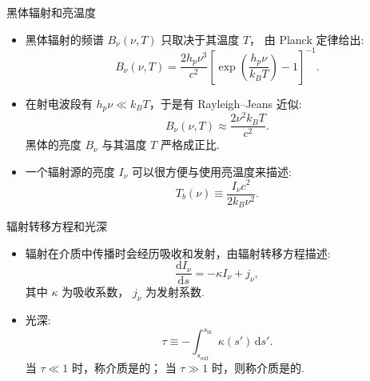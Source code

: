 \documentclass{beamer}
\newcommand{\R}[1]{\text{#1}}  %
\newcommand{\D}[1]{\R{d}#1}
\newcommand{\diff}[2]{\frac{\D{#1}}{\D{#2}}}
\let\emph\relax  %
\begin{document}
\begin{frame}{黑体辐射和亮温度}
  \begin{itemize}
    \item \alert{黑体辐射}的频谱 $B_{\nu}(\nu, T)$ 只取决于其温度 $T$，
      由 \alert{Planck 定律}给出:
      \begin{equation}
        B_{\nu}(\nu, T) =
          \frac{2 h_p \nu^3}{c^2} \left[ \exp\left(
            \frac{h_p \nu}{k_B T} \right) - 1 \right]^{-1} .
      \end{equation}
    \item 在射电波段有 $h_p \nu \ll k_B T$，于是有 \alert{Rayleigh--Jeans 近似}:
      \begin{equation}
        B_{\nu}(\nu, T) \approx \frac{2 \nu^2 k_B T}{c^2} .
      \end{equation}
      黑体的亮度 $B_{\nu}$ 与其温度 $T$ 严格成正比.
    \item 一个辐射源的亮度 $I_{\nu}$ 可以很方便与使用\alert{亮温度}来描述:
      \begin{equation}
        T_b(\nu) \equiv \frac{I_{\nu} c^2}{2 k_B \nu^2} .
      \end{equation}
  \end{itemize}
\end{frame}

\begin{frame}{辐射转移方程和光深}
  \begin{itemize}
    \item 辐射在介质中传播时会经历吸收和发射，由\alert{辐射转移方程}描述:
      \begin{equation}
        \diff{I_{\nu}}{s} = -\kappa I_{\nu} + j_{\nu} ,
      \end{equation}
      其中 $\kappa$ 为吸收系数， $j_{\nu}$ 为发射系数.
    \item \alert{光深}:
      \begin{equation}
        \tau \equiv
          - \int_{s_{\R{out}}}^{s_{\R{in}}} \kappa(s') \,\D{s'} .
      \end{equation}
      当 $\tau \ll 1$ 时，称介质是\emph{光学薄}的；
      当 $\tau \gg 1$ 时，则称介质是\emph{光学厚}的.
  \end{itemize}
\end{frame}
\end{document}
